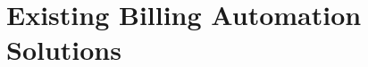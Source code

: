 \chapter{Existing Billing Automation Solutions}\label{ch:existing-billing-automation-solutions}




